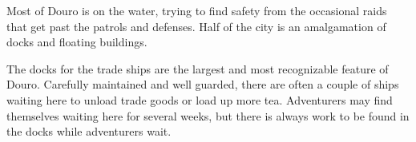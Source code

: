 Most of Douro is on the water, trying to find safety from the occasional raids that get past the patrols and defenses.
Half of the city is an amalgamation of docks and floating buildings.

The docks for the trade ships are the largest and most recognizable feature of Douro.
Carefully maintained and well guarded, there are often a couple of ships waiting here to unload trade goods or load up more tea.
Adventurers may find themselves waiting here for several weeks, but there is always work to be found in the docks while adventurers wait.
